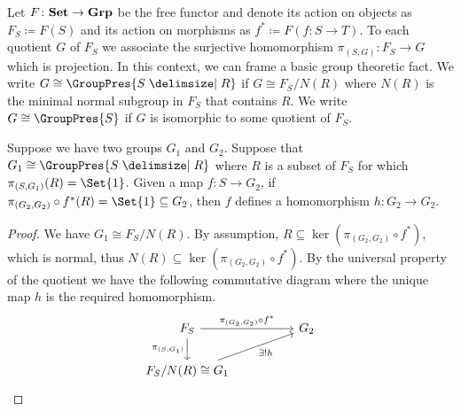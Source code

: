 Let $F \colon \mathbf{Set} \to \mathbf{Grp}$ be the free functor and denote its action on objects as $F_S \coloneqq F(S)$ and its action on morphisms as  $f^* \coloneqq F(f \colon S \to T)$. To each quotient $G$ of $F_S$ we associate the surjective homomorphism $\pi_{(S,G)} \colon F_S \to G$ which is projection. In this context, we can frame a basic group theoretic fact. We write $G \cong \GroupPres{S \relations R}$ if  $G \cong F_S / N(R)$ where $N(R)$ is the minimal normal subgroup in $F_S$ that contains $R$. We write  $G \cong \GroupPres{S}$ if  $G$ is isomorphic to some quotient of  $F_S$.

\begin{theorem}
	Suppose we have two groups $G_1$ and $G_2$. Suppose that $G_1 \cong \GroupPres{S \relations R}$ where $R$ is a subset of $F_S$ for which $\pi_{(S,G_1)}(R) = \Set{1}$.
	Given a map $f \colon S \to G_2$, if  $\pi_{(G_2, G_2)} \circ f^*(R) = \Set{1} \subseteq G_2$, then $f$ defines a homomorphism $h \colon G_2 \to G_2$.
	\label{thm:homomorphism_universal_prop}
\end{theorem}
\begin{proof}
	We have $G_1 \cong F_{S}/N(R)$.
	By assumption, $R \subseteq \ker(\pi_{(G_2,G_2)} \circ f^*)$, which is normal, thus $N(R) \subseteq \ker(\pi_{(G_2,G_2)} \circ f^*)$.
	By the universal property of the quotient we have the following commutative diagram where the unique map $h$ is the required homomorphism.
	\begin{equation*}
		\begin{tikzcd}
			F_{S} \ar[rr, "\pi_{(G_2,G_2)} \circ f^*"] \ar[d, "\pi_{(S,G_1)}"'] & & G_2 \\
			F_{S}/N(R) \cong G_1 \ar[rru, "\exists ! h"']
		\end{tikzcd}
	\end{equation*}
\end{proof}

